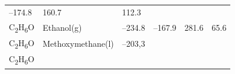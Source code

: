 \documentclass[
  9pt,
]{extbook}
\theoremstyle{definition}
\theoremstyle{definition}
\theoremstyle{definition}
\theoremstyle{remark}
\begin{document}
\begin{longtable}[]{@{}llllll@{}}
\begin{minipage}[t]{0.15\columnwidth}
--174.8\strut
\end{minipage} & \begin{minipage}[t]{0.14\columnwidth}\raggedright
160.7\strut
\end{minipage} & \begin{minipage}[t]{0.14\columnwidth}\raggedright
112.3\strut
\end{minipage}\tabularnewline
\begin{minipage}[t]{0.07\columnwidth}\raggedright
C\textsubscript{2}H\textsubscript{6}O\strut
\end{minipage} & \begin{minipage}[t]{0.17\columnwidth}\raggedright
Ethanol(g)\strut
\end{minipage} & \begin{minipage}[t]{0.15\columnwidth}\raggedright
--234.8\strut
\end{minipage} & \begin{minipage}[t]{0.15\columnwidth}\raggedright
--167.9\strut
\end{minipage} & \begin{minipage}[t]{0.14\columnwidth}\raggedright
281.6\strut
\end{minipage} & \begin{minipage}[t]{0.14\columnwidth}\raggedright
65.6\strut
\end{minipage}\tabularnewline
\begin{minipage}[t]{0.07\columnwidth}\raggedright
C\textsubscript{2}H\textsubscript{6}O\strut
\end{minipage} & \begin{minipage}[t]{0.17\columnwidth}\raggedright
Methoxymethane(l)\strut
\end{minipage} & \begin{minipage}[t]{0.15\columnwidth}\raggedright
--203,3\strut
\end{minipage} & \begin{minipage}[t]{0.15\columnwidth}\raggedright
\strut
\end{minipage} & \begin{minipage}[t]{0.14\columnwidth}\raggedright
\strut
\end{minipage} & \begin{minipage}[t]{0.14\columnwidth}\raggedright
\strut
\end{minipage}\tabularnewline
\begin{minipage}[t]{0.07\columnwidth}\raggedright
C\textsubscript{2}H\textsubscript{6}O\strut
\end{minipage} & \begin{minipage}[t]{0.17\columnwidth}\raggedright

\end{minipage}
\end{longtable}
\end{document}

